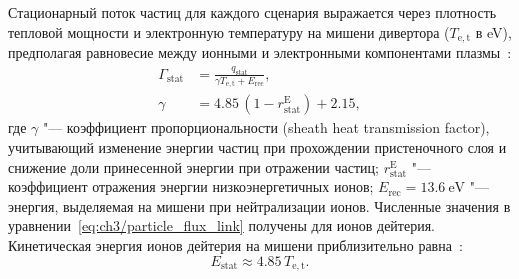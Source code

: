 Стационарный поток частиц для каждого сценария выражается через плотность тепловой мощности и электронную температуру на мишени дивертора ($T_{\mathrm{e,t}}$ в \si{\electronvolt}), предполагая равновесие между ионными и электронными компонентами плазмы~\cite{Brida2017, Stangeby2000}:
\begin{subequations}
	\label{eq:ch3/particle_flux_link}
	\begin{align}
		\Gamma_{\mathrm{stat}} & =\frac{q_{\mathrm{stat}}}{\gamma T_{\mathrm{e,t}} + E_{\mathrm{rec}}}, \\
		\gamma                 & =4.85\,(1-r_{\mathrm{stat}}^{\mathrm{E}})+2.15,
	\end{align}
\end{subequations}
где $\gamma$ "--- коэффициент пропорциональности (sheath heat transmission factor), учитывающий изменение энергии частиц при прохождении пристеночного слоя и снижение доли принесенной энергии при отражении частиц; $r_{\mathrm{stat}}^{\mathrm{E}}$ "--- коэффициент отражения энергии низкоэнергетичных ионов; $E_{\mathrm{rec}}=\SI{13.6}{\electronvolt}$ "--- энергия, выделяемая на мишени при нейтрализации ионов. Численные значения в уравнении~\cref{eq:ch3/particle_flux_link} получены для ионов дейтерия. Кинетическая энергия ионов дейтерия на мишени приблизительно равна~\cite{Brida2017}:
\begin{equation}
	\label{eq:ch3/stat_energy}
	E_{\mathrm{stat}}\approx 4.85\, T_{\mathrm{e,t}}.
\end{equation}

